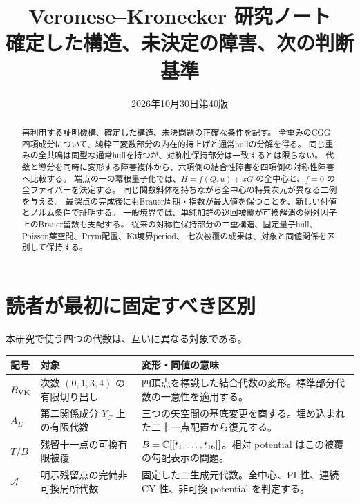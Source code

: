 
\title{Veronese--Kronecker 研究ノート\\\large 確定した構造、未決定の障害、次の判断基準}
\author{}\date{2026年10月30日\quad 第40版}
\maketitle
\begin{abstract}
再利用する証明機構、確定した構造、未決問題の正確な条件を記す。
全重みのCGG四項成分について、純粋三変数部分の内在的持上げと通常hullの分解を得る。
同じ重みの全共鳴は同型な通常hullを持つが、対称性保持部分は一致するとは限らない。
代数と導分を同時に変形する障害複体から、六項側の結合性障害を四項側の対称性障害へ比較する。
端点の一の冪根量子化では、$H=f(Q,u)+xG$ の全中心と、$f=0$ の全ファイバーを決定する。
同じ関数斜体を持ちながら全中心の特異次元が異なる二例を与える。
最深点の完成後にもBrauer周期・指数が最大値を保つことを、新しい付値とノルム条件で証明する。
一般境界では、単純加群の巡回被覆が可換解消の例外因子上のBrauer留数も支配する。
従来の対称性保持部分の二重構造、固定量子hull、Poisson葉空間、Prym配置、K3境界period、
七次被覆の成果は、対象と同値関係を区別して保持する。
\end{abstract}
\tableofcontents

\section{読者が最初に固定すべき区別}

本研究で使う四つの代数は、互いに異なる対象である。
\begin{center}\small
\begin{tabular}{p{24mm}p{46mm}p{74mm}}\toprule
記号&対象&変形・同値の意味\\\midrule
$B_{\rm VK}$&次数 $(0,1,3,4)$ の有限切り出し&四頂点を標識した結合代数の変形。標準部分代数の一意性を適用する。\\
$A_E$&第二関係成分 $Y_C$ 上の有限代数&三つの矢空間の基底変更を商する。埋め込まれた二十一点配置から復元する。\\
$T/B$&残留十一点の可換有限被覆&$B=\mathbb C[[t_1,\ldots,t_{16}]]$。相対 potential はこの被覆の勾配表示の問題。\\
$\mathcal A$&明示残留点の完備非可換局所代数&固定した二生成元代数。全中心、PI 性、連続 CY 性、非可換 potential を判定する。\\\bottomrule
\end{tabular}
\end{center}

